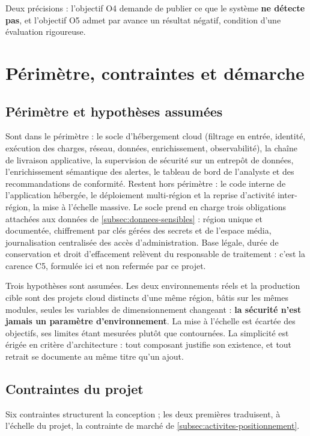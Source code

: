 Deux précisions : l'objectif O4 demande de publier ce que le système \textbf{ne détecte pas}, et
l'objectif O5 admet par avance un résultat négatif, condition d'une évaluation rigoureuse.

\section{Périmètre, contraintes et démarche}
\label{sec:perimetre-contraintes-demarche}

\subsection{Périmètre et hypothèses assumées}
\label{subsec:perimetre}

Sont dans le périmètre : le socle d'hébergement cloud (filtrage en entrée, identité, exécution
des charges, réseau, données, enrichissement, observabilité), la chaîne de livraison applicative,
la supervision de sécurité sur un entrepôt de données, l'enrichissement sémantique des alertes,
le tableau de bord de l'analyste et des recommandations de conformité. Restent hors périmètre :
le code interne de l'application hébergée, le déploiement multi-région et la reprise d'activité
inter-région, la mise à l'échelle massive. Le socle prend en charge trois obligations attachées
aux données de \cref{subsec:donnees-sensibles} : région unique et documentée, chiffrement par
clés gérées des secrets et de l'espace média, journalisation centralisée des accès
d'administration. Base légale, durée de conservation et droit d'effacement relèvent du
responsable de traitement : c'est la carence C5, formulée ici et non refermée par ce projet.

Trois hypothèses sont assumées. Les deux environnements réels et la production cible sont des
projets cloud distincts d'une même région, bâtis sur les mêmes modules, seules les variables de
dimensionnement changeant : \textbf{la sécurité n'est jamais un paramètre d'environnement}. La
mise à l'échelle est écartée des objectifs, ses limites étant mesurées plutôt que contournées. La
simplicité est érigée en critère d'architecture : tout composant justifie son existence, et tout
retrait se documente au même titre qu'un ajout.

\subsection{Contraintes du projet}
\label{subsec:contraintes}

Six contraintes structurent la conception ; les deux premières traduisent, à l'échelle du projet,
la contrainte de marché de \cref{subsec:activites-positionnement}.

